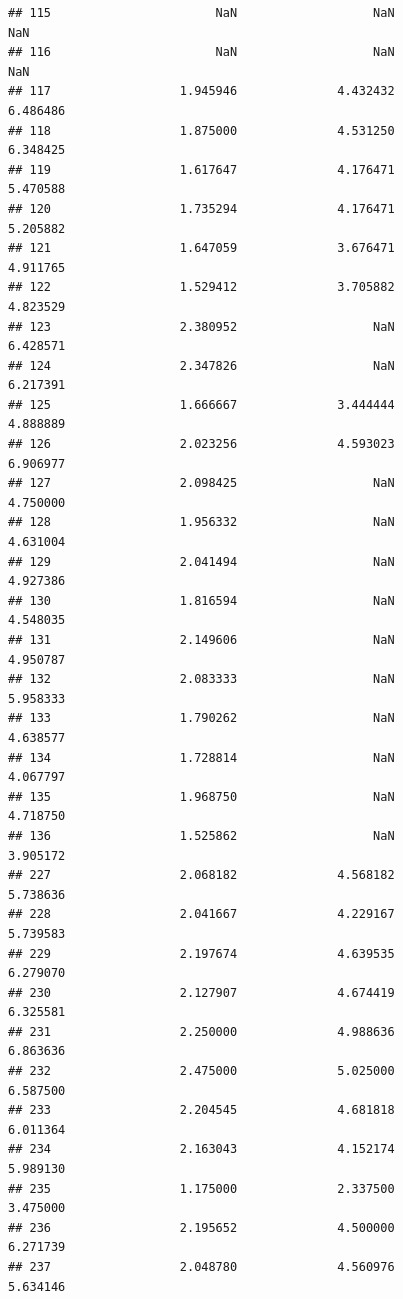 \documentclass[]{article}
\begin{document}
\begin{verbatim}
## 115                       NaN                   NaN                      NaN
## 116                       NaN                   NaN                      NaN
## 117                  1.945946              4.432432                 6.486486
## 118                  1.875000              4.531250                 6.348425
## 119                  1.617647              4.176471                 5.470588
## 120                  1.735294              4.176471                 5.205882
## 121                  1.647059              3.676471                 4.911765
## 122                  1.529412              3.705882                 4.823529
## 123                  2.380952                   NaN                 6.428571
## 124                  2.347826                   NaN                 6.217391
## 125                  1.666667              3.444444                 4.888889
## 126                  2.023256              4.593023                 6.906977
## 127                  2.098425                   NaN                 4.750000
## 128                  1.956332                   NaN                 4.631004
## 129                  2.041494                   NaN                 4.927386
## 130                  1.816594                   NaN                 4.548035
## 131                  2.149606                   NaN                 4.950787
## 132                  2.083333                   NaN                 5.958333
## 133                  1.790262                   NaN                 4.638577
## 134                  1.728814                   NaN                 4.067797
## 135                  1.968750                   NaN                 4.718750
## 136                  1.525862                   NaN                 3.905172
## 227                  2.068182              4.568182                 5.738636
## 228                  2.041667              4.229167                 5.739583
## 229                  2.197674              4.639535                 6.279070
## 230                  2.127907              4.674419                 6.325581
## 231                  2.250000              4.988636                 6.863636
## 232                  2.475000              5.025000                 6.587500
## 233                  2.204545              4.681818                 6.011364
## 234                  2.163043              4.152174                 5.989130
## 235                  1.175000              2.337500                 3.475000
## 236                  2.195652              4.500000                 6.271739
## 237                  2.048780              4.560976                 5.634146

\end{verbatim}
\end{document}
